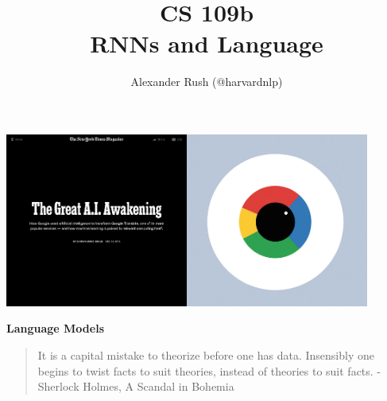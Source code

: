 \documentclass{beamer}
\title[Seq2seq]{CS 109b \\   RNNs and Language }
\author[Alexander Rush]{Alexander Rush  (@harvardnlp) \\  
}
\date{}
\begin{document}
\begin{frame}
  \titlepage
\end{frame}

\begin{frame}
  \begin{center}
    \includegraphics[width=12cm]{nytai}
  \end{center}
\end{frame}

\begin{frame}
  \begin{center}
    \textbf{Language Models}
  \end{center}
\end{frame}

\begin{frame}
  \begin{quote}
    It is a capital mistake to theorize before one has
    data. Insensibly one begins to twist facts to suit theories,
    instead of theories to suit facts. -Sherlock Holmes, A Scandal in Bohemia
  \end{quote}


\end{frame}
\end{document}
